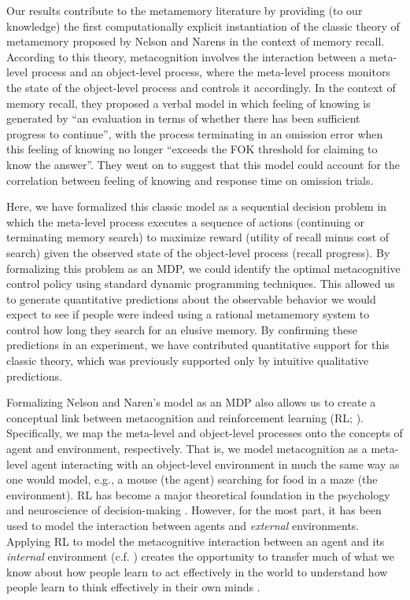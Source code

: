 Our results contribute to the metamemory literature by providing (to our knowledge) the first computationally explicit instantiation of the classic theory of metamemory proposed by Nelson and Narens \citeyearpar{nelson1990metamemory} in the context of memory recall. According to this theory, metacognition involves the interaction between a meta-level process and an object-level process, where the meta-level process monitors the state of the object-level process and controls it accordingly. In the context of memory recall, they proposed a verbal model in which feeling of knowing is generated by ``an evaluation in terms of whether there has been sufficient progress to continue'', with the process terminating in an omission error when this feeling of knowing no longer ``exceeds the FOK threshold for claiming to know the answer''. They went on to suggest that this model could account for the correlation between feeling of knowing and response time on omission trials.

Here, we have formalized this classic model as a sequential decision problem in which the meta-level process executes a sequence of actions (continuing or terminating memory search) to maximize reward (utility of recall minus cost of search) given the observed state of the object-level process (recall progress). By formalizing this problem as an MDP, we could identify the optimal metacognitive control policy using standard dynamic programming techniques. This allowed us to generate quantitative predictions about the observable behavior we would expect to see if people were indeed using a rational metamemory system to control how long they search for an elusive memory. By confirming these predictions in an experiment, we have contributed quantitative support for this classic theory, which was previously supported only by intuitive qualitative predictions.

Formalizing Nelson and Naren's model as an MDP also allows us to create a conceptual link between metacognition and reinforcement learning (RL; \citealp{sutton2018reinforcement}). Specifically, we map the meta-level and object-level processes onto the concepts of agent and environment, respectively. That is, we model metacognition as a meta-level agent interacting with an object-level environment in much the same way as one would model, e.g., a mouse (the agent) searching for food in a maze (the environment). RL has become a major theoretical foundation in the psychology and neuroscience of decision-making \citep{niv2009reinforcement,dayan2008decision,glimcher2011understanding}. However, for the most part, it has been used to model the interaction between agents and \emph{external} environments. Applying RL to model the metacognitive interaction between an agent and its \emph{internal} environment (c.f. \citealp{simon1955behavioral}) creates the opportunity to transfer much of what we know about how people learn to act effectively in the world to understand how people learn to think effectively in their own minds \citep{lieder2018rational}.


